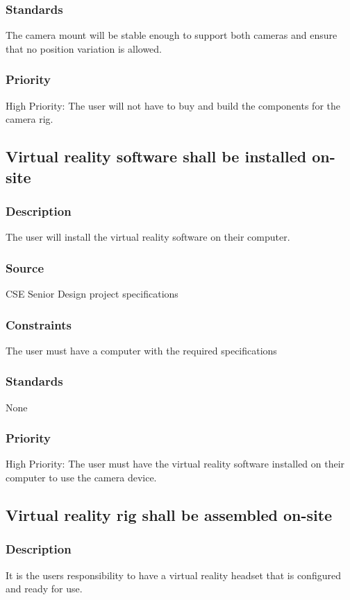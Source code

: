 \subsubsection{Standards}
The camera mount will be stable enough to support both cameras and ensure that no position variation is allowed. 
\subsubsection{Priority}
High Priority: The user will not have to buy and build the components for the camera rig.

\subsection{Virtual reality software shall be installed on-site}
\subsubsection{Description}
The user will install the virtual reality software on their computer.
\subsubsection{Source}
CSE Senior Design project specifications
\subsubsection{Constraints}
The user must have a computer with the required specifications
\subsubsection{Standards}
None
\subsubsection{Priority}
High Priority: The user must have the virtual reality software installed on their computer to use the camera device.

\subsection{Virtual reality rig shall be assembled on-site}
\subsubsection{Description}
It is the users responsibility to have a virtual reality headset that is configured and ready for use. 
